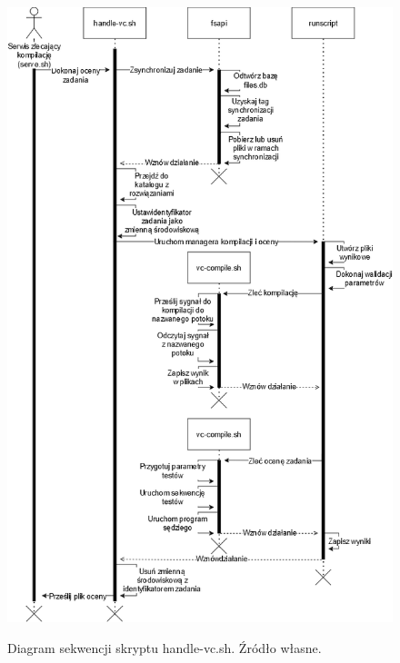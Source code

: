 \begin{figure}[!h]
	\begin{center}
		\resizebox{0.9\textwidth}{!} {
			\includegraphics{img/2/handle.png}
		}
		\caption[Diagram sekwencji skryptu handle-vc.sh]{Diagram sekwencji skryptu handle-vc.sh. Źródło własne.}
		\label{handle}
	\end{center}
\end{figure}

